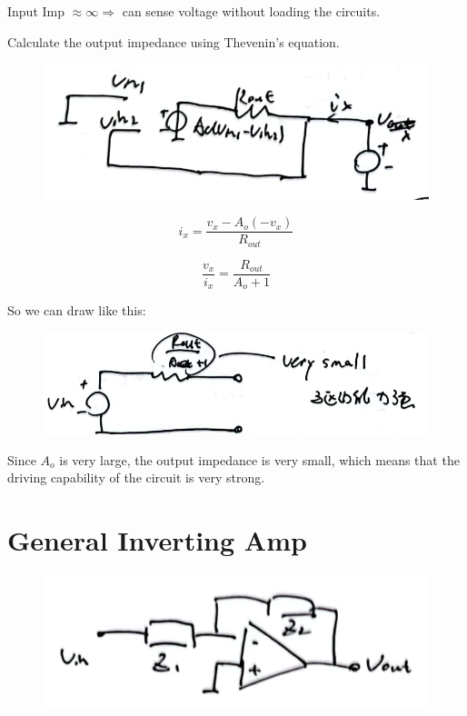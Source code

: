 \documentclass[fontset=windows]{article}
\begin{document}
Input Imp $\approx \infty \Longrightarrow$ can sense voltage without loading the circuits. 

Calculate the output impedance using Thevenin's equation. 

\begin{figure}[htbp]
    \centering
    \includegraphics[scale=0.8]{12.jpg}
    \captionsetup{labelformat=empty}
    \caption{}
    \label{12}
\end{figure}

$$i_x=\frac{v_x-A_o(-v_x)}{R_{out}}$$

$$\frac{v_x}{i_x}=\frac{R_{out}}{A_o+1}$$

So we can draw like this: 

\begin{figure}[htbp]
    \centering
    \includegraphics[scale=0.8]{13.jpg}
    \captionsetup{labelformat=empty}
    \caption{}
    \label{13}
\end{figure}

Since $A_o$ is very large, the output impedance is very small, which means that the driving capability of the circuit is very strong. 

\section*{General Inverting Amp}

\begin{figure}[htbp]
    \centering
    \includegraphics[scale=0.8]{14.jpg}
    \captionsetup{labelformat=empty}
    \caption{}
    \label{14}
\end{figure}
\end{document}
